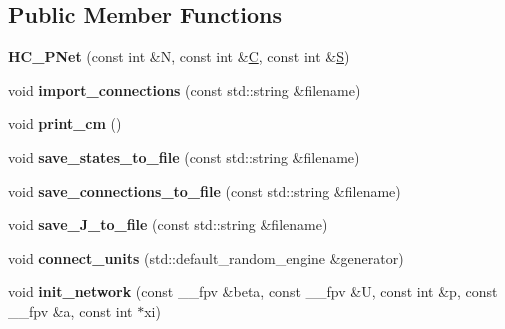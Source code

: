 \subsection*{Public Member Functions}
\begin{DoxyCompactItemize}
\item 
{\bfseries H\+C\+\_\+\+P\+Net} (const int \&N, const int \&\hyperlink{classHC__PNet_a40f377e7056967c60f966101eb986035}{C}, const int \&\hyperlink{classHC__PNet_a059016e26712e4fd5f6fdbdc6a41ce79}{S})\hypertarget{classHC__PNet_a5c7aca1e9fa59ca5aee29894de0b970f}{}\label{classHC__PNet_a5c7aca1e9fa59ca5aee29894de0b970f}

\item 
void {\bfseries import\+\_\+connections} (const std\+::string \&filename)\hypertarget{classHC__PNet_a91cd9aaa6acbf80f6dcca26ba1e5cd4f}{}\label{classHC__PNet_a91cd9aaa6acbf80f6dcca26ba1e5cd4f}

\item 
void {\bfseries print\+\_\+cm} ()\hypertarget{classHC__PNet_a49ff9fe01c408c0c028d736135dd4ef3}{}\label{classHC__PNet_a49ff9fe01c408c0c028d736135dd4ef3}

\item 
void {\bfseries save\+\_\+states\+\_\+to\+\_\+file} (const std\+::string \&filename)\hypertarget{classHC__PNet_a0f1e9277e2f5320ff638c9d6adf7c1db}{}\label{classHC__PNet_a0f1e9277e2f5320ff638c9d6adf7c1db}

\item 
void {\bfseries save\+\_\+connections\+\_\+to\+\_\+file} (const std\+::string \&filename)\hypertarget{classHC__PNet_a7d72eed734dc1a8c42f760db4ce19f0a}{}\label{classHC__PNet_a7d72eed734dc1a8c42f760db4ce19f0a}

\item 
void {\bfseries save\+\_\+\+J\+\_\+to\+\_\+file} (const std\+::string \&filename)\hypertarget{classHC__PNet_aaf22bc06a174cbe262a0ddbceb8cb079}{}\label{classHC__PNet_aaf22bc06a174cbe262a0ddbceb8cb079}

\item 
void {\bfseries connect\+\_\+units} (std\+::default\+\_\+random\+\_\+engine \&generator)\hypertarget{classHC__PNet_a404e5bb38475c42180d615e2dda8418d}{}\label{classHC__PNet_a404e5bb38475c42180d615e2dda8418d}

\item 
void {\bfseries init\+\_\+network} (const \+\_\+\+\_\+fpv \&beta, const \+\_\+\+\_\+fpv \&U, const int \&p, const \+\_\+\+\_\+fpv \&a, const int $\ast$xi)\hypertarget{classHC__PNet_afff5ec340c4a16084b2d8668a3c96a2f}{}\label{classHC__PNet_afff5ec340c4a16084b2d8668a3c96a2f}


\end{DoxyCompactItemize}
